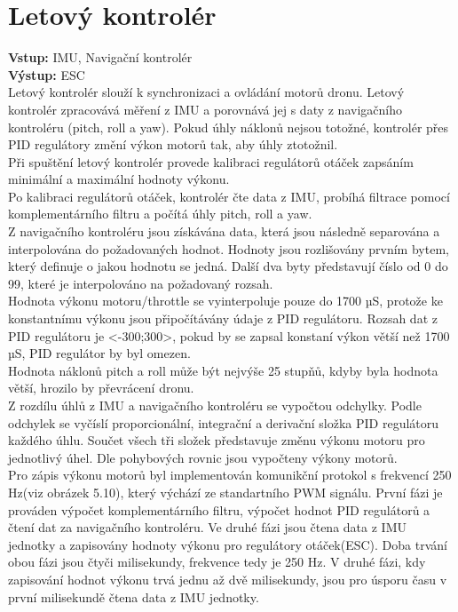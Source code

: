 \section{Letový kontrolér} 
\textbf{Vstup:} IMU, Navigační kontrolér\\
\textbf{Výstup:} ESC\\
Letový kontrolér slouží k synchronizaci a ovládání motorů dronu. Letový kontrolér zpracovává měření z IMU a porovnává jej s daty z navigačního kontroléru (pitch, roll a yaw). Pokud úhly náklonů nejsou totožné, kontrolér přes PID regulátory změní výkon motorů tak, aby úhly ztotožnil.\\
Při spuštění letový kontrolér provede kalibraci regulátorů otáček zapsáním minimální a maximální hodnoty výkonu.\\
Po kalibraci regulátorů otáček, kontrolér čte data z IMU, probíhá filtrace pomocí komplementárního filtru a počítá úhly pitch, roll a yaw.\\
Z navigačního kontroléru jsou získávána data, která jsou následně separována a interpolována do požadovaných hodnot. Hodnoty jsou rozlišovány prvním bytem, který definuje o jakou hodnotu se jedná. Další dva byty představují číslo od 0 do 99, které je interpolováno na požadovaný rozsah.\\
Hodnota výkonu motoru/throttle se vyinterpoluje pouze do 1700 µS, protože ke konstantnímu výkonu jsou připočítávány údaje z PID regulátoru. Rozsah dat z PID regulátoru je <-300;300>, pokud by se zapsal konstaní výkon větší než 1700 µS, PID regulátor by byl omezen.\\
Hodnota náklonů pitch a roll  může být nejvýše 25 stupňů, kdyby byla hodnota větší, hrozilo by převrácení dronu.\\
Z rozdílu úhlů z IMU a navigačního kontroléru se vypočtou odchylky. Podle odchylek se vyčíslí proporcionální, integrační a derivační složka PID regulátoru každého úhlu. Součet všech tři složek představuje změnu výkonu motoru pro jednotlivý úhel. Dle pohybových rovnic jsou vypočteny výkony motorů.\\
Pro zápis výkonu motorů byl implementován komunikční protokol s frekvencí 250 Hz(viz obrázek 5.10), který výchází ze standartního PWM signálu. První fázi je prováden výpočet komplementárního filtru, výpočet hodnot PID regulátorů a čtení dat za navigačního kontroléru. Ve druhé fázi jsou čtena data z IMU jednotky a zapisovány hodnoty výkonu pro regulátory otáček(ESC). Doba trvání obou fázi jsou čtyči milisekundy, frekvence tedy je 250 Hz. V druhé fázi, kdy zapisování hodnot výkonu trvá jednu až dvě milisekundy, jsou pro úsporu času v první milisekundě čtena data z IMU jednotky.\\
